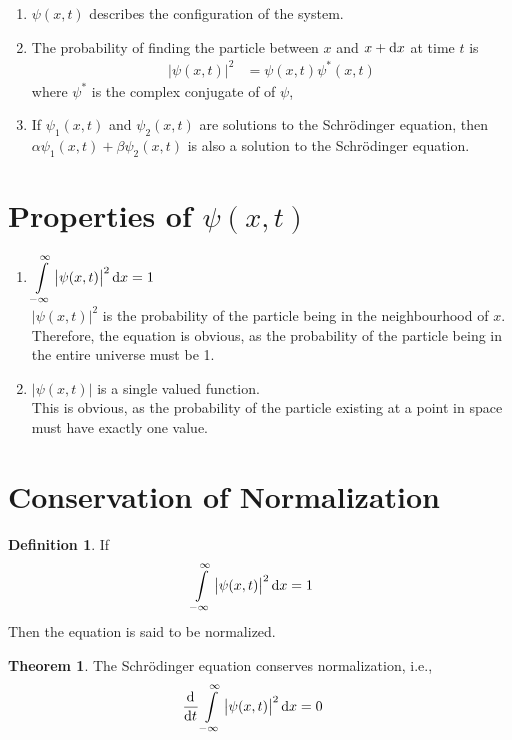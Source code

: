 \documentclass[titlepage, fleqn, a4paper, 12pt, twoside]{article}
\theoremstyle{definition}
\newtheorem{definition}{Definition}
\theoremstyle{theorem}
\newtheorem{theorem}{Theorem}
\let\Oldsection\section
\renewcommand{\section}{\FloatBarrier\Oldsection}
\begin{document}
\begin{enumerate}
	\item
		$\psi(x,t)$ describes the configuration of the system.
	\item
		The probability of finding the particle between $x$ and $x + \dif x$ at time $t$ is
		\begin{align*}
			\left| \psi(x,t) \right|^2 & = \psi(x,t) \psi^*(x,t)
		\end{align*}
		where $\psi^*$ is the complex conjugate of of $\psi$,
	\item
		If $\psi_1(x,t)$ and $\psi_2(x,t)$ are solutions to the Schrödinger equation, then $\alpha \psi_1(x,t) + \beta \psi_2(x,t)$ is also a solution to the Schrödinger equation.
\end{enumerate}

\section{Properties of $\psi(x,t)$}

\begin{enumerate}
	\item
		$\displaystyle \int\limits_{-\infty}^{\infty} \left| \psi(x,t) \right|^2 \dif x = 1$\\
		$\left| \psi(x,t) \right|^2$ is the probability of the particle being in the neighbourhood of $x$.
		Therefore, the equation is obvious, as the probability of the particle being in the entire universe must be 1.
	\item
		$\left| \psi(x,t) \right|$ is a single valued function.\\
		This is obvious, as the probability of the particle existing at a point in space must have exactly one value.
\end{enumerate}

\section{Conservation of Normalization}

\begin{definition}
	If
	\begin{align*}
		\int\limits_{-\infty}^{\infty} \left| \psi(x,t) \right|^2 \dif x & = 1
	\end{align*}
	Then the equation is said to be normalized.
\end{definition}

\begin{theorem}
	The Schrödinger equation conserves normalization, i.e.,
	\begin{align*}
		\dod{}{t} \int\limits_{-\infty}^{\infty} \left| \psi(x,t) \right|^2 \dif x & = 0
	\end{align*}
\end{theorem}
\end{document}
